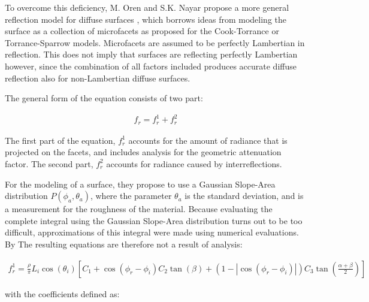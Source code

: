 To overcome this deficiency, M. Oren and S.K. Nayar propose a more general reflection model for diffuse surfaces \cite{OrenNayar} \cite{ImprovedDiffuse}, which borrows ideas from modeling the surface as a collection of microfacets as proposed for the Cook-Torrance or Torrance-Sparrow models. Microfacets are assumed to be perfectly Lambertian in reflection. This does not imply that surfaces are reflecting perfectly Lambertian however, since the combination of all factors included produces accurate diffuse reflection also for non-Lambertian diffuse surfaces. 

The general form of the equation consists of two part:

	\begin{eqnarray*}
		f_r = f_r^1 + f_r^2
	\end{eqnarray*}

\noindent The first part of the equation, $f_r^1$ accounts for the amount of radiance that is projected on the facets, and includes analysis for the geometric attenuation factor. The second part, $f_r^2$ accounts for radiance caused by interreflections.


For the modeling of a surface, they propose to use a Gaussian Slope-Area distribution $P(\phi_a, \theta_a)$, where the parameter $\theta_a$ is the standard deviation, and is a measurement for the roughness of the material. Because evaluating the complete integral using the Gaussian Slope-Area distribution turns out to be too difficult, approximations of this integral were made using numerical evaluations. By The resulting equations are therefore not a result of analysis: 


	\begin{eqnarray*}
		f_r^1 = \frac{\rho}{\pi}L_i\cos(\theta_i)\left[C_1+\cos(\phi_r-\phi_i)C_2\tan(\beta) 
			  + (1-|\cos(\phi_r-\phi_i)|)C_3\tan\left(\frac{\alpha+\beta}{2}\right)\right]
	\end{eqnarray*}

\noindent with the coefficients defined as:

